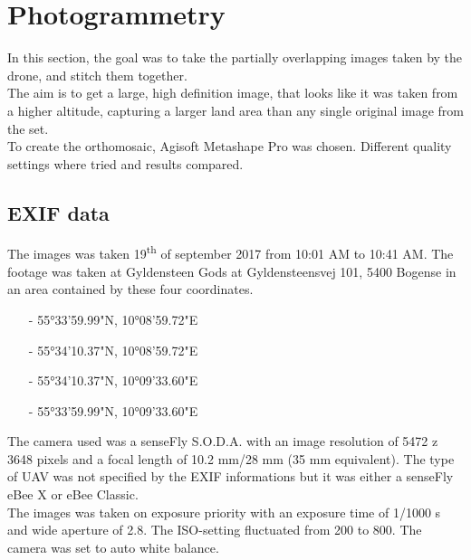 \documentclass[../Head/Main.tex]{subfiles}
\begin{document}
\section{Photogrammetry}\label{sec:photo}
In this section, the goal was to take the partially overlapping images taken by the drone, and stitch them together.\\
The aim is to get a large, high definition image, that looks like it was taken from a higher altitude, 
capturing a larger land area than any single original image from the set.\\
To create the orthomosaic, Agisoft Metashape Pro was chosen. 
Different quality settings where tried and results compared.

\subsection{EXIF data}
The images was taken 19\textsuperscript{th} of september 2017 from 10:01 AM to 10:41 AM. The footage was taken at Gyldensteen Gods at Gyldensteensvej 101, 5400 Bogense in an area contained by these four coordinates.
\begin{itemize}
\item[-] 55°33'59.99"N, 10°08'59.72"E \vspace{-7pt}
\item[-] 55°34'10.37"N, 10°08'59.72"E \vspace{-7pt}
\item[-] 55°34'10.37"N, 10°09'33.60"E \vspace{-7pt}
\item[-] 55°33'59.99"N, 10°09'33.60"E
\end{itemize}

The camera used was a senseFly S.O.D.A. with an image resolution of 5472 z 3648 pixels and a focal length of 10.2 mm/28 mm (35 mm equivalent). The type of UAV was not specified by the EXIF informations but it was either a senseFly eBee X or eBee Classic.\\
The images was taken on exposure priority with an exposure time of 1/1000 s and wide aperture of 2.8. The ISO-setting fluctuated from 200 to 800. The camera was set to auto white balance.

\end{document}
